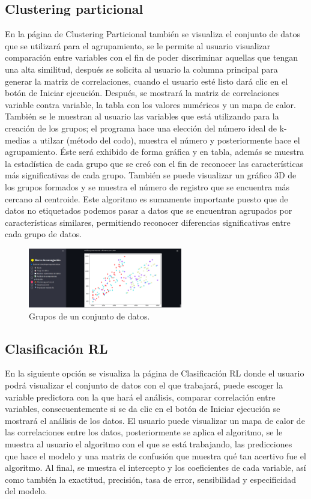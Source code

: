 \documentclass{article}
\begin{document}
\subsection{Clustering particional}
\noindent En la página de Clustering Particional también se visualiza el conjunto de datos que se utilizará para el agrupamiento, se le permite al usuario visualizar comparación entre variables
con el fin de poder discriminar aquellas que tengan una alta similitud, después se solicita al usuario la columna principal para generar la matriz de correlaciones, cuando el usuario esté listo
dará clic en el botón de Iniciar ejecución. Después, se mostrará la matriz de correlaciones variable contra variable, la tabla con los valores numéricos y un mapa de calor. También se le muestran
al usuario las variables que está utilizando para la creación de los grupos; el programa hace una elección del número ideal de k-medias a utilzar (método del codo), muestra el número y posteriormente hace
el agrupamiento. Éste será exhibido de forma gráfica y en tabla, además se muestra la estadística de cada grupo que se creó con el fin de reconocer las características más significativas de cada
grupo. También se puede visualizar un gráfico 3D de los grupos formados y se muestra el número de registro que se encuentra más cercano al centroide. Este algoritmo es sumamente importante puesto
que de datos no etiquetados podemos pasar a datos que se encuentran agrupados por características similares, permitiendo reconocer diferencias significativas entre cada grupo de datos.

\begin{figure}[!htb]
	\centering
	\includegraphics[width=0.6\textwidth]{figures/pagina-clustering.png}
	\caption{Grupos de un conjunto de datos.}
	\label{fig:pagina-clustering}
\end{figure}

\subsection{Clasificación RL}
\noindent En la siguiente opción se visualiza la página de Clasificación RL donde el usuario podrá visualizar el conjunto de datos con el que trabajará, puede escoger la variable predictora con la que
hará el análisis, comparar correlación entre variables, consecuentemente si se da clic en el botón de Iniciar ejecución se mostrará el análisis de los datos. El usuario puede visualizar un mapa de calor
de las correlaciones entre los datos, posteriormente se aplica el algoritmo, se le muestra al usuario el algoritmo con el que se está trabajando, las predicciones que hace el modelo y una matriz de confusión
que muestra qué tan acertivo fue el algoritmo. Al final, se muestra el intercepto y los coeficientes de cada variable, así como también la exactitud, precisión, tasa de error, sensibilidad y especificidad del modelo. \newline
\end{document}

